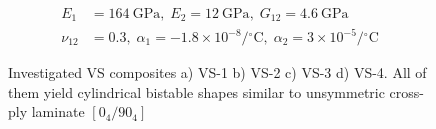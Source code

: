 \documentclass[journal]{new-aiaa}
\begin{document}
\begin{equation}
\begin{aligned}
E_1 &= 164 \: \text{GPa}, \; E_2 = 12\: \text{GPa}, \; G_{12}= 4.6 \: \text{GPa} \\
\nu_{12} &= 0.3, \; \alpha_1= -1.8 \times 10^{-8}/ {^\circ} \text{C} , \; \alpha_2= 3 \times 10^{-5}/ {^\circ} \text{C}
\end{aligned}
\label{matprop}
\end{equation}
\begin{figure}[!htb]
	\captionsetup[subfloat]{farskip=0.5pt,captionskip=2pt}
	\centering
	\hspace{0.5 cm}
	
	\hspace{0.5 cm}
	\caption{Investigated VS composites a) VS-1 b) VS-2 c) VS-3 d) VS-4. All of them yield cylindrical bistable shapes similar to unsymmetric cross-ply laminate $[0_4/90_4]$}
	\label{fig:fiberpaths}
\end{figure}
\end{document}
